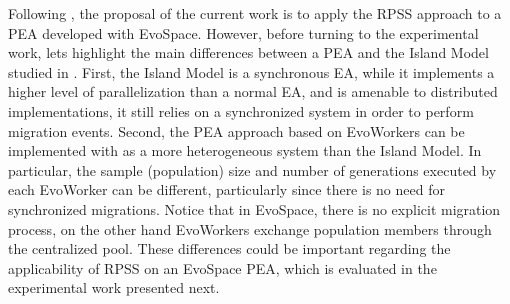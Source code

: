\documentclass{sig-alternate}
\begin{document}
Following \cite{fuku1}, the proposal of the current work is to apply the RPSS approach to a PEA developed with EvoSpace.
However, before turning to the experimental work, lets highlight the main differences between a PEA and the Island Model studied in \cite{fuku1,fuku2}.
First, the Island Model is a synchronous EA, while it implements a higher level of parallelization than a normal EA, and is amenable to distributed implementations,
it still relies on a synchronized system in order to perform migration events.
Second, the PEA approach based on EvoWorkers can be implemented with as a more heterogeneous system than the Island Model.
In particular, the sample (population) size and number of generations executed by each EvoWorker can be different,
particularly since there is no need for synchronized migrations.
Notice that in EvoSpace, there is no explicit migration process, on the other hand EvoWorkers exchange population members through the centralized pool.
These differences could be important regarding the applicability of RPSS on an EvoSpace PEA,
which is evaluated in the experimental work presented next.




%
%
%
\end{document}
